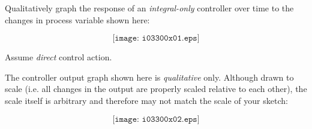 

Qualitatively graph the response of an {\it integral-only} controller over time to the changes in process variable shown here:

$$\texttt{[image: i03300x01.eps]}$$

Assume {\it direct} control action.







The controller output graph shown here is {\it qualitative} only.  Although drawn to scale (i.e. all changes in the output are properly scaled relative to each other), the scale itself is arbitrary and therefore may not match the scale of your sketch:

$$\texttt{[image: i03300x02.eps]}$$










